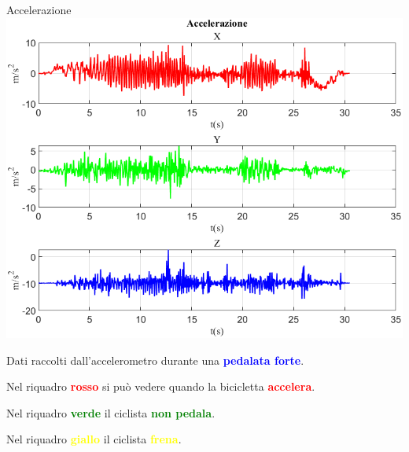 \documentclass[a4paper, 9pt]{beamer}
\begin{document}
	\begin{frame}
		\titlepage
	\end{frame}
	
	\begin{frame}{{Accelerazione}}
		\centering\includegraphics[height=.6\textheight]{figure/esempio_accXY}
		
		\vspace{.05\textheight}
		Dati raccolti dall'accelerometro durante una \textcolor{blue}{\textbf{pedalata forte}}.
		
		Nel riquadro \textcolor{red}{\textbf{rosso}} si può vedere quando la bicicletta \textcolor{red}{\textbf{accelera}}.
		
		Nel riquadro \textcolor{green}{\textbf{verde}} il ciclista \textcolor{green}{\textbf{non pedala}}.
		
		Nel riquadro \textcolor{yellow}{\textbf{giallo}} il ciclista \textcolor{yellow}{\textbf{frena}}.
	\end{frame}
	
\end{document}
